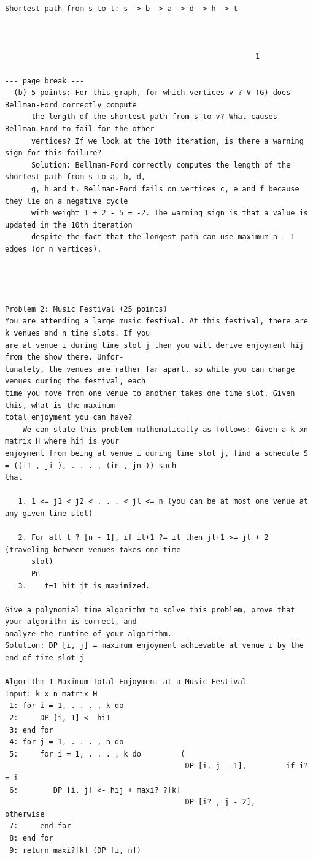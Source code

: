 \documentclass[12pt]{article}
\begin{document}
\begin{Verbatim}[breaklines=true,fontsize=\small]
     Shortest path from s to t: s -> b -> a -> d -> h -> t



                                                         1

--- page break ---
  (b) 5 points: For this graph, for which vertices v ? V (G) does Bellman-Ford correctly compute
      the length of the shortest path from s to v? What causes Bellman-Ford to fail for the other
      vertices? If we look at the 10th iteration, is there a warning sign for this failure?
      Solution: Bellman-Ford correctly computes the length of the shortest path from s to a, b, d,
      g, h and t. Bellman-Ford fails on vertices c, e and f because they lie on a negative cycle
      with weight 1 + 2 - 5 = -2. The warning sign is that a value is updated in the 10th iteration
      despite the fact that the longest path can use maximum n - 1 edges (or n vertices).




Problem 2: Music Festival (25 points)
You are attending a large music festival. At this festival, there are k venues and n time slots. If you
are at venue i during time slot j then you will derive enjoyment hij from the show there. Unfor-
tunately, the venues are rather far apart, so while you can change venues during the festival, each
time you move from one venue to another takes one time slot. Given this, what is the maximum
total enjoyment you can have?
    We can state this problem mathematically as follows: Given a k xn matrix H where hij is your
enjoyment from being at venue i during time slot j, find a schedule S = ((i1 , ji ), . . . , (in , jn )) such
that

   1. 1 <= j1 < j2 < . . . < jl <= n (you can be at most one venue at any given time slot)

   2. For all t ? [n - 1], if it+1 ?= it then jt+1 >= jt + 2 (traveling between venues takes one time
      slot)
      Pn
   3.    t=1 hit jt is maximized.

Give a polynomial time algorithm to solve this problem, prove that your algorithm is correct, and
analyze the runtime of your algorithm.
Solution: DP [i, j] = maximum enjoyment achievable at venue i by the end of time slot j

Algorithm 1 Maximum Total Enjoyment at a Music Festival
Input: k x n matrix H
 1: for i = 1, . . . , k do
 2:     DP [i, 1] <- hi1
 3: end for
 4: for j = 1, . . . , n do
 5:     for i = 1, . . . , k do         (
                                         DP [i, j - 1],         if i? = i
 6:        DP [i, j] <- hij + maxi? ?[k]
                                         DP [i? , j - 2],       otherwise
 7:     end for
 8: end for
 9: return maxi?[k] (DP [i, n])




\end{Verbatim}
\end{document}
